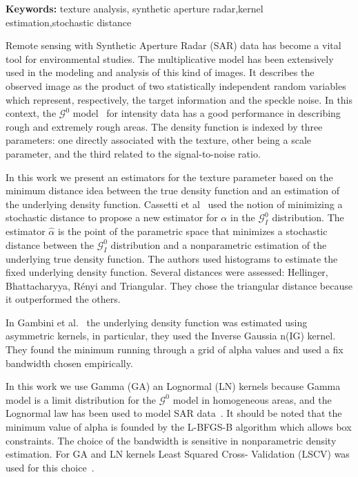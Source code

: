\documentclass[a4paper]{article} %
\def\keywords#1{{\bf Keywords: }{#1}}
\begin{document}
\keywords{texture analysis, synthetic aperture radar,kernel estimation,stochastic distance}

\vspace{0.5cm}
Remote sensing with Synthetic Aperture Radar (SAR) data has become a vital tool for environmental studies. The multiplicative model has been extensively used in the modeling and analysis of this kind of images. It describes the observed image as the product of two statistically independent random variables which represent, respectively, the target information and the speckle noise. 
In this context, the $\mathcal{G}^{0}$  model~\cite{Frery97} for intensity data has a good performance in describing rough and extremely rough areas. The density function is indexed by three parameters: one directly associated with the texture, other being a scale parameter, and the third related to the signal-to-noise ratio.

In this work we present an estimators for the texture parameter based on the minimum distance idea between the true density function and an estimation of the underlying density function. Cassetti et al~\cite{APSAR2013ParameterEstimationStochasticDistances} used the notion of minimizing a stochastic distance to propose a new estimator for $\alpha$ in the $\mathcal{G}_I^0$ distribution.
The estimator $\widehat{\alpha}$ is the point of the parametric space that minimizes a stochastic distance between the $\mathcal{G}_I^0$ distribution and a nonparametric estimation of the underlying true density function. The authors used histograms to estimate the fixed underlying density function. Several distances were assessed: Hellinger, Bhattacharyya, R\'enyi and Triangular. They chose the triangular distance because it outperformed the others. 

In Gambini et al.~\cite{gambini2015} the underlying density function was estimated using asymmetric kernels, in particular, they used the Inverse Gaussia n(IG) kernel. They found the minimum running through a grid of alpha values and used a fix bandwidth chosen empirically. 

In this work we use Gamma (GA) an Lognormal (LN) kernels because  Gamma model is a limit distribution for the $\mathcal{G}^0$ model in homogeneous areas, and the Lognormal law has been used to model SAR data~\cite{Szajnowski1977}. It should be noted that the minimum value of alpha is founded by the L-BFGS-B algorithm which allows box constraints. The choice of the bandwidth is sensitive in nonparametric density estimation. For GA and LN kernels Least Squared Cross-
Validation (LSCV) was used for this choice~\cite{Rudemo1982}.
\end{document}
